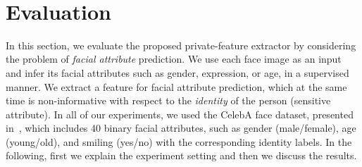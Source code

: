 \documentclass[10pt,journal,compsoc]{IEEEtran}
\newcommand{\alert}[1]{\textcolor{purple}{#1}}
\begin{document}
                                                \\  %
\section{Evaluation}\label{sec:eval}%

In this section, we evaluate the proposed private-feature extractor by considering the problem of \emph{facial attribute} prediction. We use each face image as an input and infer its facial attributes such as gender, expression, or age, in a supervised manner. We extract a feature for facial attribute prediction, which at the same time is non-informative with respect to the \emph{identity} of the person (sensitive attribute). In all of our experiments, we used the CelebA face dataset, presented in~\cite{liu2015}, which includes 40 binary facial attributes, such as gender (male/female), age (young/old), and smiling (yes/no) with the corresponding identity labels. In the following, first we explain the experiment setting and then we discuss the results.
\end{document}
